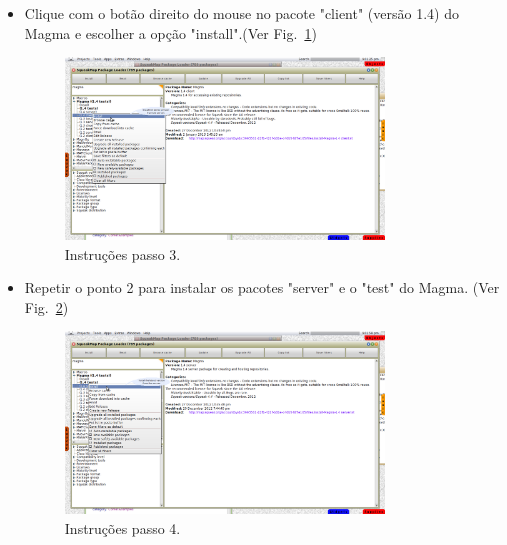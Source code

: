 \documentclass[a4paper, 10pt]{article}
\begin{document}
\begin{newpage}
\begin{itemize}
\item{Clique com o botão direito do mouse no pacote "client" (versão 1.4) do Magma e escolher a opção "install".(Ver Fig.~\ref{fig:passo3_InstallMagmaClient})}

\begin{figure}[!htb]
\centering
\includegraphics[width=0.8\textwidth]{passo3_InstallMagmaClient.png}
\caption{Instruções passo 3.}
\label{fig:passo3_InstallMagmaClient}
\end{figure}


\item{Repetir o ponto 2 para instalar os pacotes  "server" e o "test" do Magma. (Ver Fig.~\ref{fig:passo4_InstallMagmaServer})}

\begin{figure}[!htb]
\centering
\includegraphics[width=0.8\textwidth]{passo4_InstallMagmaServer.png}
\caption{Instruções passo 4.}
\label{fig:passo4_InstallMagmaServer}
\end{figure}


\end{itemize}
\end{newpage}
\end{document}
